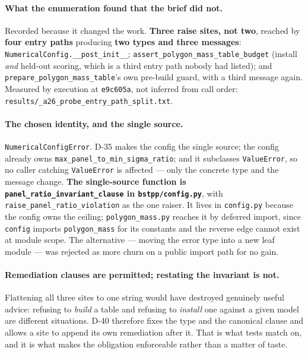 \documentclass[
  10pt,
]{article}
\begin{document}
\paragraph{What the enumeration found that the brief did not.}
Recorded because it changed the work. \textbf{Three raise sites, not two}, reached by \textbf{four entry paths} producing \textbf{two types and three messages}: \texttt{NumericalConfig.\_\_post\_init\_\_}; \texttt{assert\_polygon\_mass\_table\_budget} (install \emph{and} held-out scoring, which is a third entry path nobody had listed); and \texttt{prepare\_polygon\_mass\_table}'s own pre-build guard, with a third message again. Measured by execution at \texttt{e9c605a}, not inferred from call order: \texttt{results/\allowbreak{}\_a26\_probe\_\allowbreak{}entry\_path\_split.txt}.

\paragraph{The chosen identity, and the single source.}
\texttt{NumericalConfigError}. D-35 makes the config the single source; the config already owns \texttt{max\_panel\_to\_min\_sigma\_ratio}; and it subclasses \texttt{ValueError}, so no caller catching \texttt{ValueError} is affected --- only the concrete type and the message change. \textbf{The single-source function is \texttt{panel\_ratio\_invariant\_clause} in \texttt{bstpp/config.py}}, with \texttt{raise\_panel\_ratio\_violation} as the one raiser. It lives in \texttt{config.py} because the config owns the ceiling; \texttt{polygon\_mass.py} reaches it by deferred import, since \texttt{config} imports \texttt{polygon\_mass} for its constants and the reverse edge cannot exist at module scope. The alternative --- moving the error type into a new leaf module --- was rejected as more churn on a public import path for no gain.

\paragraph{Remediation clauses are permitted; restating the invariant is not.}
Flattening all three sites to one string would have destroyed genuinely useful advice: refusing to \emph{build} a table and refusing to \emph{install} one against a given model are different situations. D-40 therefore fixes the type and the canonical clause and allows a site to append its own remediation after it. That is what tests match on, and it is what makes the obligation enforceable rather than a matter of taste.
\end{document}
